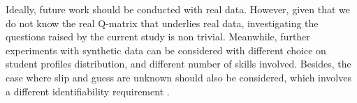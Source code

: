 \documentclass{edm_template}
\begin{document}
Ideally, future work should be conducted with real data.  However, given that we do not know the real Q-matrix that underlies real data, investigating the questions raised by the current study is non trivial.  Meanwhile, further experiments with synthetic data can be considered with different choice on student profiles distribution, and different number of skills involved. Besides, the case where slip and guess are unknown should also be considered, which involves a different identifiability requirement \cite{xu2015identifiability}. 



\end{document}
